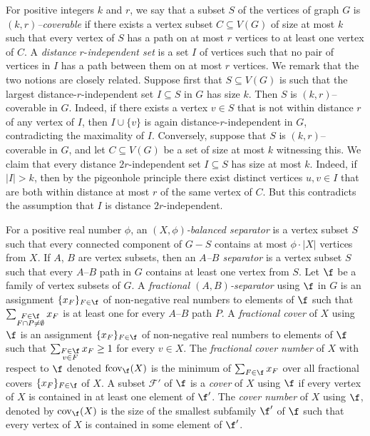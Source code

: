 For positive integers $k$ and $r$, we say that a subset $S$ of the vertices of graph $G$ is \emph{$(k,r)$--coverable} if there exists a vertex subset $C\subseteq V(G)$ of size at most $k$ such that every vertex of $S$ has a path on at most $r$ vertices to at least one vertex of $C$. A {\em distance} $r$-{\em independent set} is a set $I$ of vertices such that no pair of vertices in $I$ has a path between them on at most $r$ vertices. 
% 
We remark that the two notions are closely related. Suppose first that $S \subseteq V(G)$ is such that the largest distance-$r$-independent set $I \subseteq S$ in $G$ has size $k$. Then $S$ is $(k,r)$–coverable in $G$. Indeed, if there exists a vertex $v \in S$ that is not within distance $r$ of any vertex of $I$, then $I \cup \{v\}$ is again distance-$r$-independent in $G$, contradicting the maximality of $I$.
% 
Conversely, suppose that $S$ is $(k,r)$–coverable in $G$, and let $C \subseteq V(G)$ be a set of size at most $k$ witnessing this. We claim that every distance $2r$-independent set $I \subseteq S$ has size at most $k$. Indeed, if $|I| > k$, then by the pigeonhole principle there exist distinct vertices $u,v \in I$ that are both within distance at most $r$ of the same vertex of $C$. But this contradicts the assumption that $I$ is distance $2r$-independent.

For a positive real number $\phi$, an \emph{$(X,\phi)$-balanced separator} is a vertex subset $S$ such that every connected component of $G-S$ contains at most $\phi \cdot |X|$ vertices from $X$. If $A$, $B$ are vertex subsets, then an \emph{$A$--$B$ separator} is a vertex subset $S$ such that every $A$--$B$ path in $G$ contains at least one vertex from $S$. Let $\f$ be a family of vertex subsets of $G$. A \emph{fractional $(A,B)$-separator} using $\f$ in $G$ is an assignment $\{x_F\}_{F\in\f}$ of non-negative real numbers to elements of $\f$ such that $\sum_{\substack{F\in\f\\ F\cap P\neq\emptyset}}x_F$ is at least one for every $A$--$B$ path $P$. 
% 
A \emph{fractional cover} of $X$ using $\f$ is an assignment $\{x_F\}_{F \in \f}$ of non-negative real numbers to elements of $\f$ such that $\sum_{\substack{F \in \f \\ v \in F}} x_F \geq 1$ for every $v \in X$. The \emph{fractional cover number} of $X$ with respect to $\f$ denoted $\mathrm{fcov}_{\f}(X)$ is the minimum of $\sum_{F\in\f}x_F$ over all fractional covers $\{x_F\}_{F \in \f}$ of $X$. A subset $\mathcal{F'}$ of $\f$ is a \emph{cover} of $X$ using $\f$ if every vertex of $X$ is contained in at least one element of $\f'$. The \emph{cover number} of $X$ using $\f$, denoted by $\mathrm{cov}_{\f}(X)$ is the size of the smallest subfamily $\f'$ of $\f$ such that every vertex of $X$ is contained in some element of $\f'$. 

